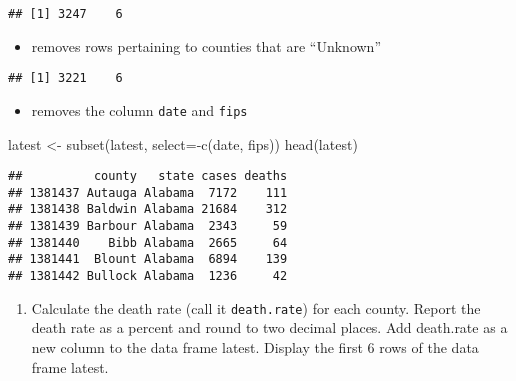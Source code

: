 \documentclass[
]{article}
\newenvironment{Shaded}{\begin{snugshade}}{\end{snugshade}}
\newcommand{\AttributeTok}[1]{\textcolor[rgb]{0.77,0.63,0.00}{#1}}
\newcommand{\FunctionTok}[1]{\textcolor[rgb]{0.00,0.00,0.00}{#1}}
\newcommand{\NormalTok}[1]{#1}
\newcommand{\OtherTok}[1]{\textcolor[rgb]{0.56,0.35,0.01}{#1}}
\newcommand{\SpecialCharTok}[1]{\textcolor[rgb]{0.00,0.00,0.00}{#1}}
\newcommand{\StringTok}[1]{\textcolor[rgb]{0.31,0.60,0.02}{#1}}
\providecommand{\tightlist}{%
  \setlength{\itemsep}{0pt}\setlength{\parskip}{0pt}}
\begin{document}
\begin{verbatim}
## [1] 3247    6
\end{verbatim}

\begin{itemize}
\tightlist
\item
  removes rows pertaining to counties that are ``Unknown''
\end{itemize}

\begin{Shaded}
\end{Shaded}

\begin{verbatim}
## [1] 3221    6
\end{verbatim}

\begin{itemize}
\tightlist
\item
  removes the column \texttt{date} and \texttt{fips}
\end{itemize}

\begin{Shaded}
\begin{Highlighting}[]
\NormalTok{latest }\OtherTok{\textless{}{-}} \FunctionTok{subset}\NormalTok{(latest, }\AttributeTok{select=}\SpecialCharTok{{-}}\FunctionTok{c}\NormalTok{(date, fips))}
\FunctionTok{head}\NormalTok{(latest)}
\end{Highlighting}
\end{Shaded}

\begin{verbatim}
##          county   state cases deaths
## 1381437 Autauga Alabama  7172    111
## 1381438 Baldwin Alabama 21684    312
## 1381439 Barbour Alabama  2343     59
## 1381440    Bibb Alabama  2665     64
## 1381441  Blount Alabama  6894    139
## 1381442 Bullock Alabama  1236     42
\end{verbatim}

\begin{enumerate}
\def\labelenumi{\alph{enumi}.}
\setcounter{enumi}{1}
\tightlist
\item
  Calculate the death rate (call it \texttt{death.rate}) for each
  county. Report the death rate as a percent and round to two decimal
  places. Add death.rate as a new column to the data frame latest.
  Display the first 6 rows of the data frame latest.
\end{enumerate}
\end{document}

